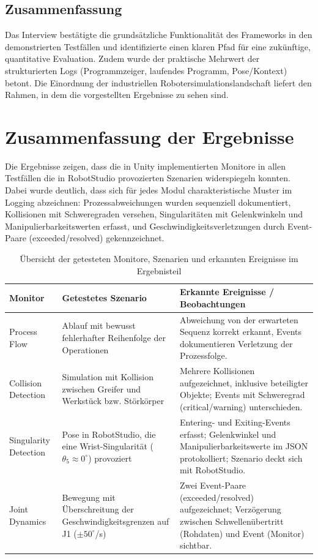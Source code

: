 \subsection{Zusammenfassung}

Das Interview bestätigte die grundsätzliche
Funktionalität des Frameworks in den demonstrierten Testfällen und
identifizierte einen klaren Pfad für eine zukünftige, quantitative Evaluation.
Zudem wurde der praktische Mehrwert der strukturierten Logs (Programmzeiger,
laufendes Programm, Pose/Kontext) betont. Die Einordnung der industriellen
Robotersimulationslandschaft liefert den Rahmen, in dem die
vorgestellten Ergebnisse zu
sehen sind.

\section{Zusammenfassung der Ergebnisse}
Die Ergebnisse zeigen, dass die in Unity implementierten Monitore in allen
Testfällen die in RobotStudio provozierten Szenarien widerspiegeln konnten.
Dabei wurde deutlich, dass sich für jedes Modul charakteristische Muster im
Logging abzeichnen: Prozessabweichungen wurden sequenziell dokumentiert,
Kollisionen mit Schweregraden versehen, Singularitäten mit Gelenkwinkeln und
Manipulierbarkeitswerten erfasst, und Geschwindigkeitsverletzungen durch
Event-Paare (exceeded/resolved) gekennzeichnet.

\begin{table}[H]
  \centering
  \small
  \begin{tabularx}{\textwidth}{lXX}
    \toprule
    \textbf{Monitor}      & \textbf{Getestetes Szenario}
    & \textbf{Erkannte Ereignisse / Beobachtungen}
    \\
    \midrule
    Process Flow          & Ablauf mit bewusst fehlerhafter
    Reihenfolge der Operationen                                &
    Abweichung von der erwarteten Sequenz korrekt erkannt, Events
    dokumentieren Verletzung der Prozessfolge.
    \\
    \addlinespace
    Collision Detection   & Simulation mit Kollision zwischen Greifer
    und Werkstück bzw. Störkörper                    & Mehrere
    Kollisionen aufgezeichnet, inklusive beteiligter Objekte; Events
    mit Schweregrad (critical/warning) unterschieden.                 \\
    \addlinespace
    Singularity Detection & Pose in RobotStudio, die eine
    Wrist-Singularität ($\theta_{5} \approx 0^\circ$) provoziert &
    Entering- und Exiting-Events erfasst; Gelenkwinkel und
    Manipulierbarkeitswerte im JSON protokolliert; Szenario deckt
    sich mit RobotStudio. \\
    \addlinespace
    Joint Dynamics        & Bewegung mit Überschreitung der
    Geschwindigkeitsgrenzen auf J1 ($\pm 50^\circ$/s)          & Zwei
    Event-Paare (exceeded/resolved) aufgezeichnet; Verzögerung
    zwischen Schwellenübertritt (Rohdaten) und Event (Monitor)
    sichtbar.       \\
    \bottomrule
  \end{tabularx}
  \caption{Übersicht der getesteten Monitore, Szenarien und erkannten
  Ereignisse im Ergebnisteil}
  \label{tab:monitor_overview}
\end{table}

